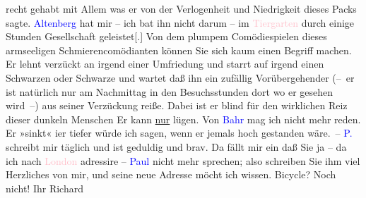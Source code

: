                     recht gehabt mit Allem was er von der Verlogenheit und Niedrigkeit dieses Packs
                    sagte.\pend
           \pstart
           \textcolor{blue}{Altenberg}{}\ledrightnote{\textcolor{blue}{Peter Altenberg}} hat mir – ich bat ihn nicht darum –
                        {\pb}im \textcolor{pink}{Tiergarten}{}\ledrightnote{\textcolor{pink}{Tiergarten Schönbrunn}} durch einige Stunden Gesellschaft geleistet{[}.{]}
                    Von dem plumpem Comödiespielen dieses armseeligen Schmierencomödianten können
                    Sie sich kaum einen Begriff machen. {\pb}Er lehnt verzückt an irgend
                    einer Umfriedung und starrt auf irgend einen Schwarzen oder Schwarze und wartet
                    daß ihn ein zufällig Vorübergehender (– er ist natürlich nur am Nachmittag
                    in den Besuchsstunden dort wo er gesehen wird –) {\pb}aus seiner Verzückung reiße.
                    Dabei ist er blind für den wirklichen Reiz dieser dunkeln Menschen\pend
           \pstart
           Er kann \uline{nur} lügen.\pend
           \pstart
           Von \textcolor{blue}{Bahr}{}\ledrightnote{\textcolor{blue}{Hermann Bahr}} mag ich {\pb}nicht mehr reden. Er »sinkt«
                    i{\geminationm}er tiefer würde ich sagen, wenn er jemals hoch gestanden wäre. –\pend
           \pstart
           \textcolor{blue}{P.}{}\ledrightnote{\textcolor{blue}{Paula Beer-Hofmann}}
                schreibt mir täglich und ist geduldig und
                    brav. Da fällt {\pb}mir ein daß
                    Sie ja – da ich nach \textcolor{pink}{London}{}\ledrightnote{\textcolor{pink}{London}} adressire – \textcolor{blue}{Paul}{}\ledrightnote{\textcolor{blue}{Paul Goldmann}} nicht mehr sprechen; also schreiben Sie
                    ihm viel Herzliches von mir, und seine neue Adresse möcht ich wissen. Bicycle?
                    Noch nicht!\pend
           \pstart Ihr \spacefill\mbox{Richard}\pend{}\endnumbering{}  
      